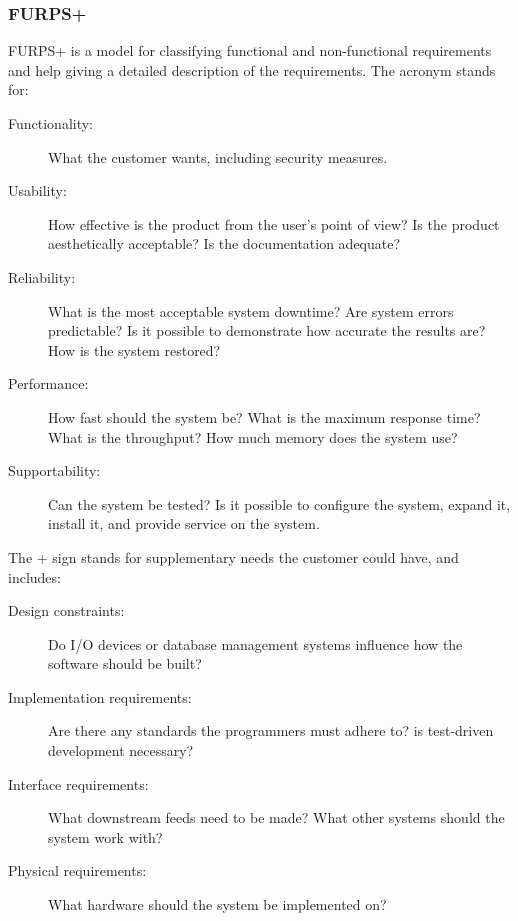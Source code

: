 \subsubsection{FURPS+}
FURPS+ is a model for classifying functional and non-functional requirements and
help giving a detailed description of the requirements. The acronym stands for:

\begin{description}
    \item [Functionality:] What the customer wants, including security measures.

    \item [Usability:] How effective is the product from the user's point of
    view? Is the product aesthetically acceptable? Is the documentation adequate?

    \item [Reliability:] What is the most acceptable system downtime? Are system
    errors predictable? Is it possible to demonstrate how accurate the results
    are? How is the system restored?

    \item [Performance:] How fast should the system be? What is the maximum
    response time? What is the throughput? How much memory does the system use?

    \item [Supportability:] Can the system be tested? Is it possible to
    configure the system, expand it, install it, and provide service on the
    system.
\end{description}

The + sign stands for supplementary needs the customer could have, and includes:

\begin{description}
    \item [Design constraints:] Do I/O devices or database management systems
    influence how the software should be built?

    \item [Implementation requirements:] Are there any standards the programmers
    must adhere to? is test-driven development necessary?

    \item [Interface requirements:] What downstream feeds need to be made? What
    other systems should the system work with?

    \item [Physical requirements:] What hardware should the system be
    implemented on?
\end{description}